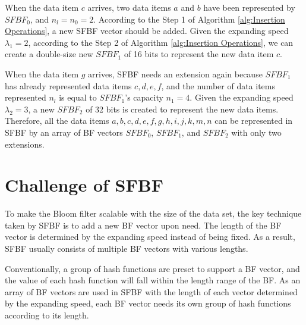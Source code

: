 \documentclass[10pt,journal,letterpaper]{IEEEtran}
\newcommand{\note}[1]{{\sffamily\itshape\bfseries\uline{#1}}}
\begin{document}
When the data item $c$ arrives, two data items $a$ and $b$ have been represented by $SFBF_0$, and $n_l=n_0=2$. According to the Step 1 of Algorithm \ref{alg:Insertion Operations}, a new SFBF vector should be added. Given the expanding speed ${\lambda _1} = 2$, according to the Step 2 of Algorithm \ref{alg:Insertion Operations}, we can create a double-size new $SFBF_1$ of 16 bits to represent the new data item $c$.

When the data item $g$ arrives, SFBF needs an extension again because $SFBF_1$ has already represented data items $c, d, e, f$, and the number of data items represented $n_l$ is equal to $SFBF_1$'s capacity $n_1=4$.
Given the expanding speed ${\lambda _2} = 3$,  a new $SFBF_2$ of 32 bits is created to represent the new data items. Therefore, all the data items $a, b, c, d, e, f, g, h, i, j, k, m, n$ can be represented in SFBF by an array of BF vectors $SFBF_0$, $SFBF_1$, and $SFBF_2$ with only two extensions.

\section{Challenge of SFBF}
\label{sec:Challenge in SFBF}
To make the Bloom filter scalable with the size of the data set, the key technique taken by SFBF is to add a new BF vector upon need. The length of the BF vector is determined by the expanding speed instead of being fixed.
  As a result, SFBF usually consists of multiple BF vectors with various lengths. %


%
Conventionally, a group of hash functions are preset to support a BF vector, and the value of each hash function will fall within the length range of the BF. As an array of BF vectors are used in SFBF with the length of each vector determined by the expanding speed, each BF vector needs its own group of hash functions according to its length.
\end{document}
